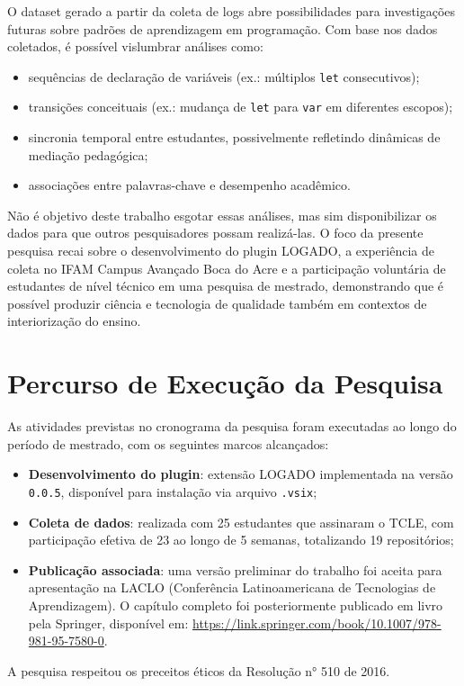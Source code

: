 O dataset gerado a partir da coleta de logs abre possibilidades para investigações futuras sobre padrões de aprendizagem em programação. Com base nos dados coletados, é possível vislumbrar análises como:
\begin{itemize}
    \item sequências de declaração de variáveis (ex.: múltiplos \texttt{let} consecutivos);
    \item transições conceituais (ex.: mudança de \texttt{let} para \texttt{var} em diferentes escopos);
    \item sincronia temporal entre estudantes, possivelmente refletindo dinâmicas de mediação pedagógica;
    \item associações entre palavras-chave e desempenho acadêmico.
\end{itemize}

Não é objetivo deste trabalho esgotar essas análises, mas sim disponibilizar os dados para que outros pesquisadores possam realizá-las. O foco da presente pesquisa recai sobre o desenvolvimento do plugin LOGADO, a experiência de coleta no IFAM Campus Avançado Boca do Acre e a participação voluntária de estudantes de nível técnico em uma pesquisa de mestrado, demonstrando que é possível produzir ciência e tecnologia de qualidade também em contextos de interiorização do ensino.

\section{Percurso de Execução da Pesquisa}
\label{sec:percurso-execucao}

As atividades previstas no cronograma da pesquisa foram executadas ao longo do período de mestrado, com os seguintes marcos alcançados:

\begin{itemize}
    \item \textbf{Desenvolvimento do plugin}: extensão LOGADO implementada na versão \texttt{0.0.5}, disponível para instalação via arquivo \texttt{.vsix};
    \item \textbf{Coleta de dados}: realizada com 25 estudantes que assinaram o TCLE, com participação efetiva de 23 ao longo de 5 semanas, totalizando 19 repositórios;
    \item \textbf{Publicação associada}: uma versão preliminar do trabalho foi aceita para apresentação na LACLO (Conferência Latinoamericana de Tecnologias de Aprendizagem). O capítulo completo foi posteriormente publicado em livro pela Springer, disponível em: \url{https://link.springer.com/book/10.1007/978-981-95-7580-0}.
\end{itemize}

A pesquisa respeitou os preceitos éticos da Resolução n° 510 de 2016.